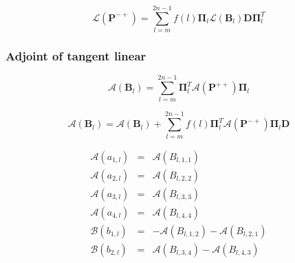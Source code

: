 \begin{equation}
\mathcal{L}(\mathbf{P}^{-+}) = \sum^{2n - 1}_{l = m} f(l) \mathbf{\Pi}_{l}\mathcal{L}(\mathbf{B}_{l})\mathbf{D}\mathbf{\Pi}^{T}_{l}
\label{eq:phase_matrices-vector-tangent_linear-P_mp_l}
\end{equation}


%
\subsubsection{Adjoint of tangent linear}
\label{sec:phase_matrices-vector-adjoint_of_tangent_linear}

\begin{equation}
\mathcal{A}(\mathbf{B}_{l}) = \sum^{2n - 1}_{l = m} \mathbf{\Pi}^{T}_{l}\mathcal{A}(\mathbf{P}^{++})\mathbf{\Pi}_{l}
\label{eq:phase_matrices-vector-adjoint_of_tangent_linear-P_pp_a}
\end{equation}

\begin{equation}
\mathcal{A}(\mathbf{B}_{l}) = \mathcal{A}(\mathbf{B}_{l}) + \sum^{2n - 1}_{l = m} f(l) \mathbf{\Pi}^{T}_{l}\mathcal{A}(\mathbf{P}^{-+})\mathbf{\Pi}_{l}\mathbf{D}
\label{eq:phase_matrices-vector-adjoint_of_tangent_linear-P_mp_a}
\end{equation}

\begin{eqnarray}
\mathcal{A}(a_{1,l}) & = & \mathcal{A}(B_{l,1,1}) \\
\mathcal{A}(a_{2,l}) & = & \mathcal{A}(B_{l,2,2}) \\
\mathcal{A}(a_{3,l}) & = & \mathcal{A}(B_{l,3,3}) \\
\mathcal{A}(a_{4,l}) & = & \mathcal{A}(B_{l,4,4}) \\
\mathcal{B}(b_{1,l}) & = & -\mathcal{A}(B_{l,1,2}) - \mathcal{A}(B_{l,2,1}) \\
\mathcal{B}(b_{2,l}) & = &  \mathcal{A}(B_{l,3,4}) - \mathcal{A}(B_{l,4,3})
\label{eq:phase_matrices-vector-adjoint_of_tangent_linear-a_and_b_a}
\end{eqnarray}
